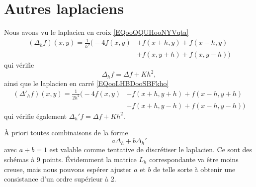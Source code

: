 \section{Autres laplaciens}


Nous avons vu le laplacien en croix \eqref{EQooQQUHooNYVqta}
\begin{subequations}\label{EQooOBWUooDEWKYv}
	\begin{align}
		(\Delta_hf)(x,y)=\frac{1}{ h^2 }\big( -4f(x,y) & +f(x+h,y)+f(x-h,y)       \\
		                                               & +f(x,y+h)+f(x,y-h) \big)
	\end{align}
\end{subequations}
qui vérifie
\begin{equation}        \label{EQooQITHooZVJlVa}
	\Delta_hf=\Delta f+Kh^2,
\end{equation}
ainsi que le laplacien en carré \eqref{EQooLHBDooSBFkho}
\begin{subequations}   \label{EQooUOYVooRpAMOC}
	\begin{align}
		(\Delta'_hf)(x,y)=\frac{1}{ 2h^2 }\Big( -4f(x,y) & +f(x+h,y+h)+f(x-h,y+h)       \\
		                                                 & +f(x+h,y-h)+f(x-h,y-h) \Big)
	\end{align}
\end{subequations}
qui vérifie également \( \Delta_h'f=\Delta f+Kh^2\).

À priori toutes combinaisons de la forme
\begin{equation}
	a\Delta_h+b\Delta_h'
\end{equation}
avec \( a+b=1\) est valable comme tentative de discrétiser le laplacien. Ce sont des schémas à \( 9\) points. Évidemment la matrice \( L_h\) correspondante va être moins creuse, mais nous pouvons espérer ajuster \( a\) et \( b\) de telle sorte à obtenir une consistance d'un ordre supérieur à \( 2\).

